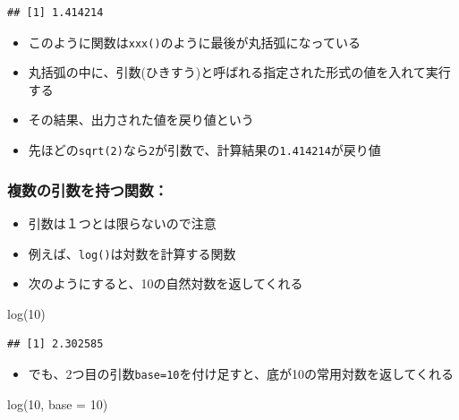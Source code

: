 \documentclass[
]{book}
\newenvironment{Shaded}{\begin{snugshade}}{\end{snugshade}}
\newcommand{\AttributeTok}[1]{\textcolor[rgb]{0.77,0.63,0.00}{#1}}
\newcommand{\DecValTok}[1]{\textcolor[rgb]{0.00,0.00,0.81}{#1}}
\newcommand{\FunctionTok}[1]{\textcolor[rgb]{0.00,0.00,0.00}{#1}}
\newcommand{\NormalTok}[1]{#1}
\providecommand{\tightlist}{%
  \setlength{\itemsep}{0pt}\setlength{\parskip}{0pt}}
\begin{document}
\begin{verbatim}
## [1] 1.414214
\end{verbatim}

\begin{itemize}
\tightlist
\item
  このように関数は\texttt{xxx()}のように最後が丸括弧になっている
\item
  丸括弧の中に、引数(ひきすう)と呼ばれる指定された形式の値を入れて実行する
\item
  その結果、出力された値を戻り値という
\item
  先ほどの\texttt{sqrt(2)}なら\texttt{2}が引数で、計算結果の\texttt{1.414214}が戻り値
\end{itemize}

\hypertarget{ux8907ux6570ux306eux5f15ux6570ux3092ux6301ux3064ux95a2ux6570}{%
\subsubsection*{複数の引数を持つ関数：}\label{ux8907ux6570ux306eux5f15ux6570ux3092ux6301ux3064ux95a2ux6570}}

\begin{itemize}
\tightlist
\item
  引数は１つとは限らないので注意
\item
  例えば、\texttt{log()}は対数を計算する関数
\item
  次のようにすると、10の自然対数を返してくれる
\end{itemize}

\begin{Shaded}
\begin{Highlighting}[]
\FunctionTok{log}\NormalTok{(}\DecValTok{10}\NormalTok{)}
\end{Highlighting}
\end{Shaded}

\begin{verbatim}
## [1] 2.302585
\end{verbatim}

\begin{itemize}
\tightlist
\item
  でも、2つ目の引数\texttt{base=10}を付け足すと、底が10の常用対数を返してくれる
\end{itemize}

\begin{Shaded}
\begin{Highlighting}[]
\FunctionTok{log}\NormalTok{(}\DecValTok{10}\NormalTok{, }\AttributeTok{base =} \DecValTok{10}\NormalTok{)}
\end{Highlighting}
\end{Shaded}
\end{document}
